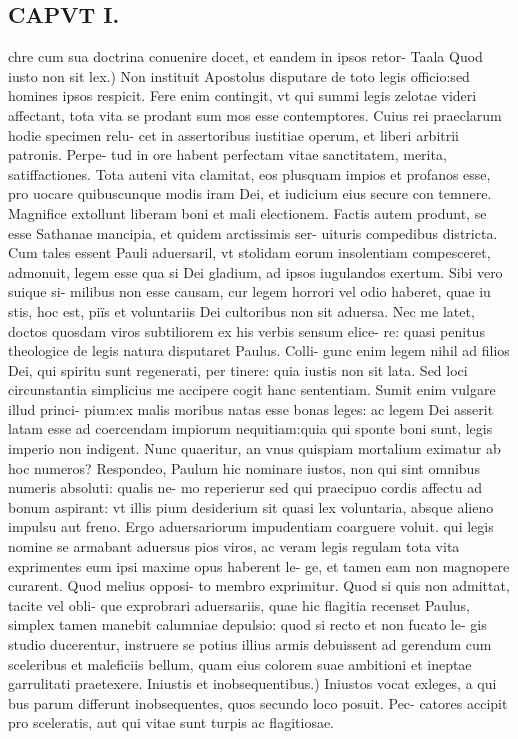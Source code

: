 \documentclass{article}
\begin{document}
\begin{pages}
\section*{CAPVT I. }
\marginpar{[ p.7 ]}\pstart chre cum sua doctrina conuenire docet, et eandem in ipsos retor-  \pend\pstart Taala Quod iusto non sit lex.) Non instituit Apostolus disputare de toto legis officio:sed homines ipsos respicit. Fere enim contingit, vt qui summi legis zelotae videri affectant, tota vita se prodant sum mos esse contemptores. Cuius rei praeclarum hodie specimen relu- cet in assertoribus iustitiae operum, et liberi arbitrii patronis. Perpe- tud in ore habent perfectam vitae sanctitatem, merita, satiffactiones. Tota auteni vita clamitat, eos plusquam impios et profanos esse, pro uocare quibuscunque modis iram Dei, et iudicium eius secure con temnere. Magnifice extollunt liberam boni et mali electionem. Factis autem produnt, se esse Sathanae mancipia, et quidem arctissimis ser- uituris compedibus districta. Cum tales essent Pauli aduersaril, vt stolidam eorum insolentiam compesceret, admonuit, legem esse qua si Dei gladium, ad ipsos iugulandos exertum. Sibi vero suique si- milibus non esse causam, cur legem horrori vel odio haberet, quae iu stis, hoc est, piïs et voluntariis Dei cultoribus non sit aduersa. Nec me latet, doctos quosdam viros subtiliorem ex his verbis sensum elice- re: quasi penitus theologice de legis natura disputaret Paulus. Colli- gunc enim legem nihil ad filios Dei, qui spiritu sunt regenerati, per tinere: quia iustis non sit lata. Sed loci circunstantia simplicius me accipere cogit hanc sententiam. Sumit enim vulgare illud princi- pium:ex malis moribus natas esse bonas leges: ac legem Dei asserit latam esse ad coercendam impiorum nequitiam:quia qui sponte boni sunt, legis imperio non indigent. Nunc quaeritur, an vnus quispiam mortalium eximatur ab hoc numeros? Respondeo, Paulum hic nominare iustos, non qui sint omnibus numeris absoluti: qualis ne- mo reperierur sed qui praecipuo cordis affectu ad bonum aspirant: vt illis pium desiderium sit quasi lex voluntaria, absque alieno impulsu aut freno. Ergo aduersariorum impudentiam coarguere voluit. qui legis nomine se armabant aduersus pios viros, ac veram legis regulam tota vita exprimentes eum ipsi maxime opus haberent le- ge, et tamen eam non magnopere curarent. Quod melius opposi- to membro exprimitur. Quod si quis non admittat, tacite vel obli- que exprobrari aduersariis, quae hic flagitia recenset Paulus, simplex tamen manebit calumniae depulsio: quod si recto et non fucato le- gis studio ducerentur, instruere se potius illius armis debuissent ad gerendum cum sceleribus et maleficiis bellum, quam eius colorem suae ambitioni et ineptae garrulitati praetexere.  \pend\pstart Iniustis et inobsequentibus.) Iniustos vocat exleges, a qui bus parum differunt inobsequentes, quos secundo loco posuit. Pec- catores accipit pro sceleratis, aut qui vitae sunt turpis ac flagitiosae.  \pend

\end{pages}
\end{document}
